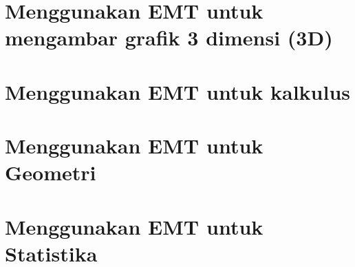 \documentclass{report}
\begin{document}
\newpage
\chapter{\Large Menggunakan EMT untuk mengambar grafik 3 dimensi (3D)}


\newpage
\chapter{\Large Menggunakan EMT untuk kalkulus}


\newpage
\chapter{\Large Menggunakan EMT untuk Geometri}


\newpage
\chapter{\Large Menggunakan EMT untuk Statistika}

\end{document}
